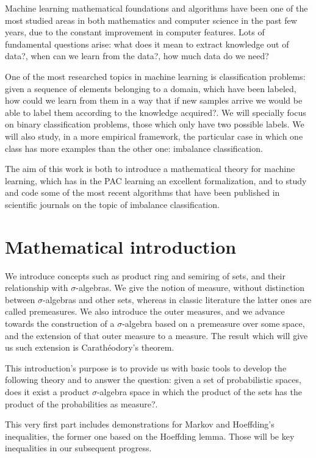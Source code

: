 Machine learning mathematical foundations and algorithms have been one of the most studied areas in both mathematics and 
computer science in the past few years, due to the constant improvement in computer features. Lots of fundamental questions 
arise: what does it mean to extract knowledge out of data?, when can we learn from the data?, how much data do we need?

One of the most researched topics in machine learning is classification problems: given a sequence of elements belonging to
a domain, which have been labeled, how could we learn from them in a way that if new samples arrive we would be able to 
label them according to the knowledge acquired?. We will specially focus on binary classification problems, those which 
only have two possible labels. We will also study, in a more empirical framework, the particular case in which one 
class has more examples than the other one: imbalance classification.

The aim of this work is both to introduce a mathematical theory for machine learning, which has in the PAC learning 
an excellent formalization, and to study and code some of the most recent algorithms that have been published in scientific
journals on the topic of imbalance classification.

\section*{Mathematical introduction}
We introduce concepts such as product ring and semiring of sets, and their relationship with $\sigma$-algebras. We give
the notion of measure, without distinction between $\sigma$-algebras and other sets, whereas in classic literature the latter
ones are called premeasures. We also introduce the outer measures, and we advance towards the construction of a $\sigma$-algebra
based on a premeasure over some space, and the extension of that outer measure to a measure. The result which will give us
such extension is Carathéodory's theorem.

This introduction's purpose is to provide us with basic tools to develop the following theory and to answer the question:
given a set of probabilistic spaces, does it exist a product $\sigma$-algebra space in which the product of the sets has
the product of the probabilities as measure?.

This very first part includes demonstrations for Markov and Hoeffding's inequalities, the former one based on the Hoeffding
lemma. Those will be key inequalities in our subsequent progress.

